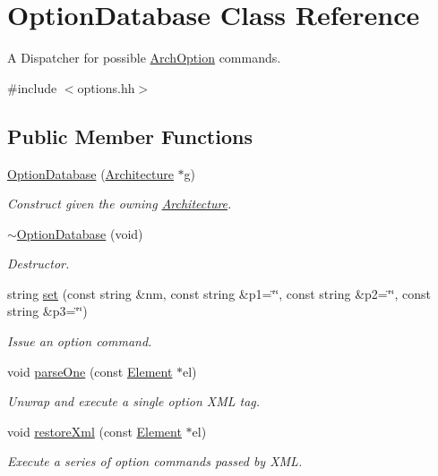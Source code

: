 \hypertarget{class_option_database}{}\section{Option\+Database Class Reference}
\label{class_option_database}


A Dispatcher for possible \mbox{\hyperlink{class_arch_option}{Arch\+Option}} commands.  




{\ttfamily \#include $<$options.\+hh$>$}

\subsection*{Public Member Functions}
\begin{DoxyCompactItemize}
\item 
\mbox{\hyperlink{class_option_database_ae5f5fef1aa229bae7fa2188cab44275a}{Option\+Database}} (\mbox{\hyperlink{class_architecture}{Architecture}} $\ast$g)
\begin{DoxyCompactList}\small\item\em Construct given the owning \mbox{\hyperlink{class_architecture}{Architecture}}. \end{DoxyCompactList}\item 
\mbox{\hyperlink{class_option_database_a5b4621e877dfce85e719f9bdf11e275f}{$\sim$\+Option\+Database}} (void)
\begin{DoxyCompactList}\small\item\em Destructor. \end{DoxyCompactList}\item 
string \mbox{\hyperlink{class_option_database_aaec7650371cbbb2a17a88393347c9ffc}{set}} (const string \&nm, const string \&p1=\char`\"{}\char`\"{}, const string \&p2=\char`\"{}\char`\"{}, const string \&p3=\char`\"{}\char`\"{})
\begin{DoxyCompactList}\small\item\em Issue an option command. \end{DoxyCompactList}\item 
void \mbox{\hyperlink{class_option_database_ae8bf1e8bf96b3bbb863ddd6f99214d5b}{parse\+One}} (const \mbox{\hyperlink{class_element}{Element}} $\ast$el)
\begin{DoxyCompactList}\small\item\em Unwrap and execute a single option X\+ML tag. \end{DoxyCompactList}\item 
void \mbox{\hyperlink{class_option_database_afe0ea0f1c7a7cd2591ac159027082149}{restore\+Xml}} (const \mbox{\hyperlink{class_element}{Element}} $\ast$el)
\begin{DoxyCompactList}\small\item\em Execute a series of {\itshape option} {\itshape commands} passed by X\+ML. \end{DoxyCompactList}\end{DoxyCompactItemize}


